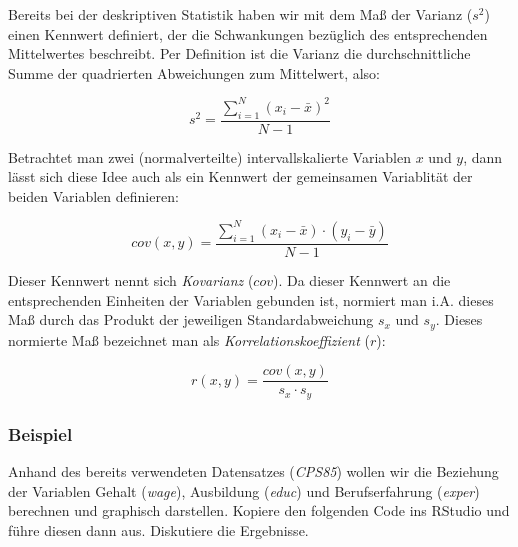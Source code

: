 \documentclass[]{article}
\newenvironment{Shaded}{\begin{snugshade}}{\end{snugshade}}
\newcommand{\KeywordTok}[1]{\textcolor[rgb]{0.13,0.29,0.53}{\textbf{#1}}}
\newcommand{\DataTypeTok}[1]{\textcolor[rgb]{0.13,0.29,0.53}{#1}}
\newcommand{\DecValTok}[1]{\textcolor[rgb]{0.00,0.00,0.81}{#1}}
\newcommand{\StringTok}[1]{\textcolor[rgb]{0.31,0.60,0.02}{#1}}
\newcommand{\CommentTok}[1]{\textcolor[rgb]{0.56,0.35,0.01}{\textit{#1}}}
\newcommand{\OperatorTok}[1]{\textcolor[rgb]{0.81,0.36,0.00}{\textbf{#1}}}
\newcommand{\NormalTok}[1]{#1}
\begin{document}
Bereits bei der deskriptiven Statistik haben wir mit dem Maß der Varianz
(\(s^2\)) einen Kennwert definiert, der die Schwankungen bezüglich des
entsprechenden Mittelwertes beschreibt. Per Definition ist die Varianz
die durchschnittliche Summe der quadrierten Abweichungen zum Mittelwert,
also:

\begin{equation} 
  s^2 = \frac{\sum_{i=1}^{N} (x_i - \bar{x})^2}{N-1}
  \label{eq:Var}
\end{equation}

Betrachtet man zwei (normalverteilte) intervallskalierte Variablen \(x\)
und \(y\), dann lässt sich diese Idee auch als ein Kennwert der
gemeinsamen Variablität der beiden Variablen definieren:

\begin{equation} 
  cov(x,y) = \frac{\sum_{i=1}^{N} (x_i - \bar{x}) \cdot (y_i - \bar{y})}{N-1}
  \label{eq:Cov}
\end{equation}

Dieser Kennwert nennt sich \emph{Kovarianz} (\(cov\)). Da dieser
Kennwert an die entsprechenden Einheiten der Variablen gebunden ist,
normiert man i.A. dieses Maß durch das Produkt der jeweiligen
Standardabweichung \(s_x\) und \(s_y\). Dieses normierte Maß bezeichnet
man als \emph{Korrelationskoeffizient} (\(r\)):

\begin{equation} 
  r(x,y) = \frac{cov(x,y)}{s_x \cdot s_y}
  \label{eq:Korr}
\end{equation}

\subsubsection*{Beispiel}\label{beispiel}

Anhand des bereits verwendeten Datensatzes (\emph{CPS85}) wollen wir die
Beziehung der Variablen Gehalt (\emph{wage}), Ausbildung (\emph{educ})
und Berufserfahrung (\emph{exper}) berechnen und graphisch darstellen.
Kopiere den folgenden Code ins RStudio und führe diesen dann aus.
Diskutiere die Ergebnisse.

\begin{Shaded}
\end{Shaded}
\end{document}
